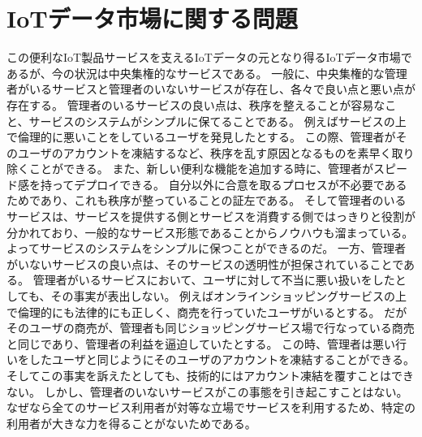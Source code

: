 \section{IoTデータ市場に関する問題}
この便利なIoT製品サービスを支えるIoTデータの元となり得るIoTデータ市場であるが、今の状況は中央集権的なサービスである。
一般に、中央集権的な管理者がいるサービスと管理者のいないサービスが存在し、各々で良い点と悪い点が存在する。
管理者のいるサービスの良い点は、秩序を整えることが容易なこと、サービスのシステムがシンプルに保てることである。
例えばサービスの上で倫理的に悪いことをしているユーザを発見したとする。
この際、管理者がそのユーザのアカウントを凍結するなど、秩序を乱す原因となるものを素早く取り除くことができる。
また、新しい便利な機能を追加する時に、管理者がスピード感を持ってデプロイできる。
自分以外に合意を取るプロセスが不必要であるためであり、これも秩序が整っていることの証左である。
そして管理者のいるサービスは、サービスを提供する側とサービスを消費する側ではっきりと役割が分かれており、一般的なサービス形態であることからノウハウも溜まっている。
よってサービスのシステムをシンプルに保つことができるのだ。
一方、管理者がいないサービスの良い点は、そのサービスの透明性が担保されていることである。
管理者がいるサービスにおいて、ユーザに対して不当に悪い扱いをしたとしても、その事実が表出しない。
例えばオンラインショッピングサービスの上で倫理的にも法律的にも正しく、商売を行っていたユーザがいるとする。
だがそのユーザの商売が、管理者も同じショッピングサービス場で行なっている商売と同じであり、管理者の利益を逼迫していたとする。
この時、管理者は悪い行いをしたユーザと同じようにそのユーザのアカウントを凍結することができる。
そしてこの事実を訴えたとしても、技術的にはアカウント凍結を覆すことはできない。
しかし、管理者のいないサービスがこの事態を引き起こすことはない。
なぜなら全てのサービス利用者が対等な立場でサービスを利用するため、特定の利用者が大きな力を得ることがないためである。

